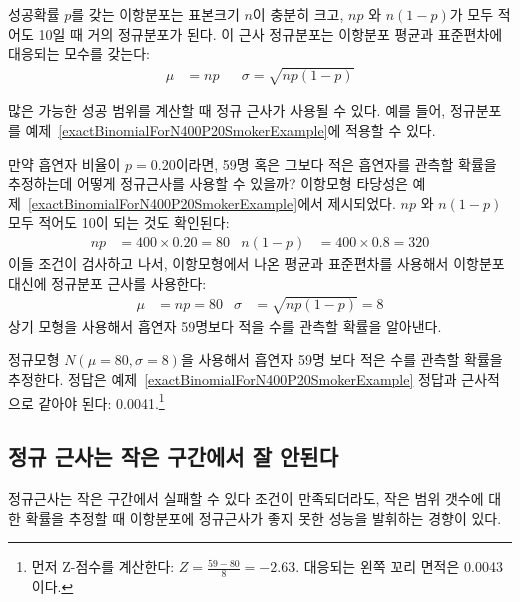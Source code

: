 \begin{termBox}{
성공확률 $p$를 갖는 이항분포는 표본크기 $n$이 충분히 크고, $np$ 와 $n(1-p)$가 모두 적어도 10일 때 거의 정규분포가 된다. 이 근사 정규분포는 이항분포 평균과 표준편차에 대응되는 모수를 갖는다: \vspace{-1.5mm}
\begin{align*}
\mu &= np
&&\sigma= \sqrt{np(1-p)}
\end{align*}}
\end{termBox}

많은 가능한 성공 범위를 계산할 때 정규 근사가 사용될 수 있다. 예를 들어, 정규분포를 예제~\ref{exactBinomialForN400P20SmokerExample}에 적용할 수 있다.

\begin{example}{
만약 흡연자 비율이 $p=0.20$이라면, 59명 혹은 그보다 적은 흡연자를 관측할 확률을 추정하는데 어떻게 정규근사를 사용할 수 있을까?} \label{approxBinomialForN400P20SmokerExample}
이항모형 타당성은 예제~\ref{exactBinomialForN400P20SmokerExample}에서 제시되었다. $np$ 와 $n(1-p)$ 모두 적어도 10이 되는 것도 확인된다:
\begin{align*}
np&=400\times 0.20=80
&n(1-p)&=400\times 0.8=320
\end{align*}
이들 조건이 검사하고 나서, 이항모형에서 나온 평균과 표준편차를 사용해서 이항분포 대신에 정규분포 근사를 사용한다:
\begin{align*}
\mu &= np = 80
&\sigma &= \sqrt{np(1-p)} = 8
\end{align*}
상기 모형을 사용해서 흡연자 59명보다 적을 수를 관측할 확률을 알아낸다.
\end{example}

\begin{exercise}
정규모형 $N(\mu=80, \sigma=8)$을 사용해서 흡연자 59명 보다 적은 수를 관측할 확률을 추정한다. 정답은 예제~\ref{exactBinomialForN400P20SmokerExample} 정답과 근사적으로 같아야 된다: 0.0041.\footnote{
먼저 Z-점수를 계산한다: $Z=\frac{59 - 80}{8} = -2.63$. 대응되는 왼쪽 꼬리 면적은 0.0043 이다.}
\end{exercise}


\subsection{정규 근사는 작은 구간에서 잘 안된다}

\begin{caution}
{정규근사는 작은 구간에서 실패할 수 있다}
{조건이 만족되더라도, 작은 범위 갯수에 대한 확률을 추정할 때 이항분포에 정규근사가 좋지 못한 성능을 발휘하는 경향이 있다.}
\end{caution}

